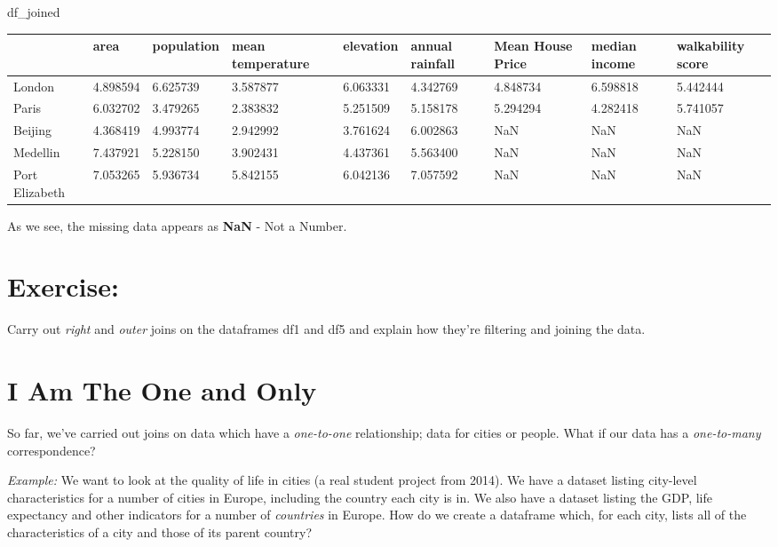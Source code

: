 \documentclass[
  letterpaper,
  DIV=11,
  numbers=noendperiod]{scrreprt}
\newenvironment{Shaded}{\begin{snugshade}}{\end{snugshade}}
\newcommand{\NormalTok}[1]{\textcolor[rgb]{0.00,0.23,0.31}{#1}}
\begin{document}
\begin{Shaded}
\begin{Highlighting}[]
\NormalTok{df\_joined}
\end{Highlighting}
\end{Shaded}

\begin{longtable}[]{@{}lllllllll@{}}
\toprule\noalign{}
& area & population & mean temperature & elevation & annual rainfall &
Mean House Price & median income & walkability score \\
\midrule\noalign{}
\endhead
\bottomrule\noalign{}
\endlastfoot
London & 4.898594 & 6.625739 & 3.587877 & 6.063331 & 4.342769 & 4.848734
& 6.598818 & 5.442444 \\
Paris & 6.032702 & 3.479265 & 2.383832 & 5.251509 & 5.158178 & 5.294294
& 4.282418 & 5.741057 \\
Beijing & 4.368419 & 4.993774 & 2.942992 & 3.761624 & 6.002863 & NaN &
NaN & NaN \\
Medellin & 7.437921 & 5.228150 & 3.902431 & 4.437361 & 5.563400 & NaN &
NaN & NaN \\
Port Elizabeth & 7.053265 & 5.936734 & 5.842155 & 6.042136 & 7.057592 &
NaN & NaN & NaN \\
\end{longtable}

As we see, the missing data appears as \textbf{NaN} - Not a Number.

\hypertarget{exercise-18}{%
\section{Exercise:}\label{exercise-18}}

Carry out \emph{right} and \emph{outer} joins on the dataframes df1 and
df5 and explain how they're filtering and joining the data.

\hypertarget{i-am-the-one-and-only}{%
\section{I Am The One and Only}\label{i-am-the-one-and-only}}

So far, we've carried out joins on data which have a \emph{one-to-one}
relationship; data for cities or people. What if our data has a
\emph{one-to-many} correspondence?

\emph{Example:} We want to look at the quality of life in cities (a real
student project from 2014). We have a dataset listing city-level
characteristics for a number of cities in Europe, including the country
each city is in. We also have a dataset listing the GDP, life expectancy
and other indicators for a number of \emph{countries} in Europe. How do
we create a dataframe which, for each city, lists all of the
characteristics of a city and those of its parent country?
\end{document}

